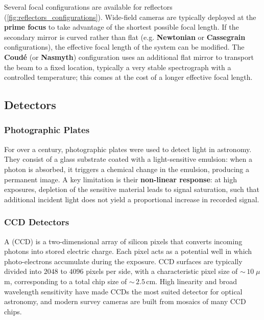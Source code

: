 Several focal configurations are available for reflectors (\cref{fig:reflectors_configurations}). Wide-field cameras are typically deployed at the \textbf{prime focus} to take advantage of the shortest possible focal length. If the secondary mirror is curved rather than flat (e.g. \textbf{Newtonian} or \textbf{Cassegrain} configurations), the effective focal length of the system can be modified. The \textbf{Coudé} (or \textbf{Nasmyth}) configuration uses an additional flat mirror to transport the beam to a fixed location, typically a very stable spectrograph with a controlled temperature; this comes at the cost of a longer effective focal length.


\subsection{Detectors} \label{subsec:detectors}

\subsubsection{Photographic Plates}

For over a century, photographic plates were used to detect light in astronomy. They consist of a glass substrate coated with a 
light-sensitive emulsion: when a photon is absorbed, it triggers a chemical 
change in the emulsion, producing a permanent image. 
A key limitation is their \textbf{non-linear response}: at high exposures, depletion of the sensitive material leads to signal saturation, such that additional incident light does not yield a proportional increase in recorded signal.

\subsubsection{CCD Detectors}

A  (CCD) is a two-dimensional array of silicon pixels that converts incoming photons into stored electric charge. Each pixel acts as a potential well in which photo-electrons accumulate during the exposure. CCD surfaces are typically divided into $2048$ to $4096$ pixels per side, with a characteristic pixel size of ${\sim}\,10\;\mu$m, corresponding to a total chip size of ${\sim}\,2.5$\,cm. High linearity and broad wavelength sensitivity have made CCDs the most suited detector for optical astronomy, and modern survey cameras are built from mosaics of many CCD chips.

\smallskip

